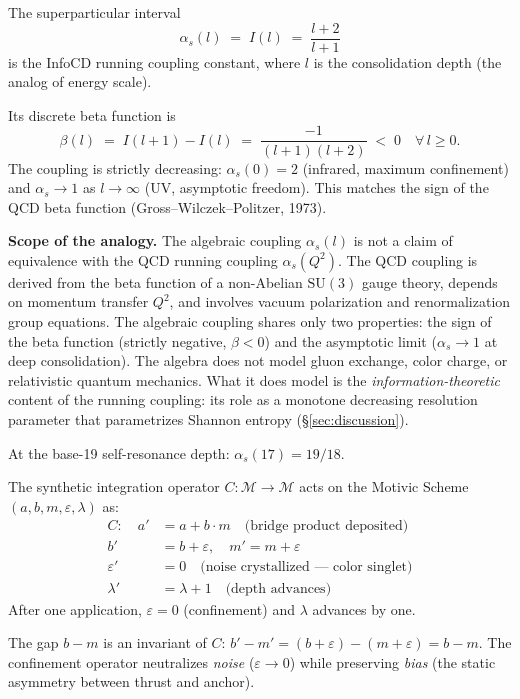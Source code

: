The superparticular interval
\[
\alpha_s(l) \;=\; I(l) \;=\; \frac{l + 2}{l + 1}
\]
is the InfoCD running coupling constant, where $l$ is the
consolidation depth (the analog of energy scale).

Its discrete beta function is
\[
\beta(l) \;=\; I(l+1) - I(l) \;=\; \frac{-1}{(l+1)(l+2)} \;<\; 0
\quad \forall\, l \geq 0.
\]
The coupling is strictly decreasing: $\alpha_s(0) = 2$ (infrared,
maximum confinement) and $\alpha_s \to 1$ as $l \to \infty$ (UV,
asymptotic freedom). This matches the sign of the QCD beta function
(Gross--Wilczek--Politzer, 1973).

\textbf{Scope of the analogy.} The algebraic coupling $\alpha_s(l)$
is not a claim of equivalence with the QCD running coupling
$\alpha_s(Q^2)$. The QCD coupling is derived from the beta function
of a non-Abelian $\mathrm{SU}(3)$ gauge theory, depends on momentum
transfer $Q^2$, and involves vacuum polarization and renormalization
group equations. The algebraic coupling shares only two properties:
the sign of the beta function (strictly negative, $\beta < 0$) and
the asymptotic limit ($\alpha_s \to 1$ at deep consolidation). The
algebra does not model gluon exchange, color charge, or relativistic
quantum mechanics. What it does model is the \emph{information-theoretic}
content of the running coupling: its role as a monotone decreasing
resolution parameter that parametrizes Shannon entropy
(\S\ref{sec:discussion}).

At the base-19 self-resonance depth: $\alpha_s(17) = 19/18$.

The synthetic integration operator $C : \mathcal{M} \to \mathcal{M}$
acts on the Motivic Scheme $(a, b, m, \varepsilon, \lambda)$ as:
\begin{align}
C: \quad
a' &= a + b \cdot m \quad \text{(bridge product deposited)} \\
b' &= b + \varepsilon, \quad m' = m + \varepsilon \\
\varepsilon' &= 0 \quad \text{(noise crystallized --- color singlet)} \\
\lambda' &= \lambda + 1 \quad \text{(depth advances)}
\end{align}
After one application, $\varepsilon = 0$ (confinement) and
$\lambda$ advances by one.

\begin{proposition}
\label{prop:schwarzian}
The gap $b - m$ is an invariant of $C$:
$b' - m' = (b + \varepsilon) - (m + \varepsilon) = b - m$.
The confinement operator neutralizes \emph{noise}
($\varepsilon \to 0$) while preserving \emph{bias}
(the static asymmetry between thrust and anchor).
\end{proposition}

